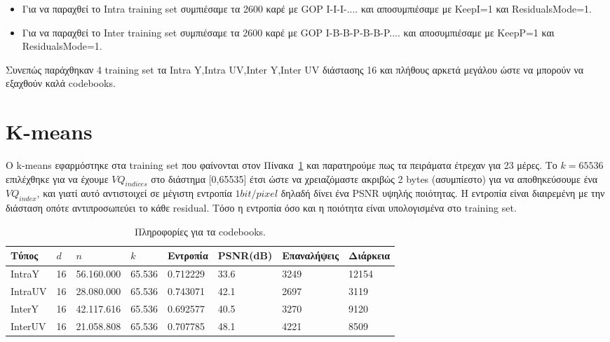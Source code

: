 \begin{itemize}
    \item Για να παραχθεί το Intra training set συμπιέσαμε τα 2600 καρέ με GOP I-I-I-.... και αποσυμπιέσαμε με KeepI=1 και ResidualsMode=1.
    \item Για να παραχθεί το Inter training set συμπιέσαμε τα 2600 καρέ με GOP I-Β-Β-P-B-B-P.... και αποσυμπιέσαμε με KeepP=1 και ResidualsMode=1.
\end{itemize}

\indent Συνεπώς παράχθηκαν 4 training set τα Intra Y,Intra UV,Inter Y,Inter UV διάστασης 16 και πλήθους αρκετά μεγάλου ώστε να μπορούν να εξαχθούν καλά codebooks.

\section{K-means}
\label{section:sect44}

\indent Ο k-means εφαρμόστηκε στα training set που φαίνονται στον Πίνακα~\ref{table:trainingset} και παρατηρούμε πως τα πειράματα έτρεχαν για 23 μέρες. Το $k=65536$ επιλέχθηκε για να έχουμε $VQ_{indices}$ στο διάστημα [0,65535] έτσι ώστε να χρειαζόμαστε ακριβώς 2 bytes (ασυμπίεστο) για να αποθηκεύσουμε ένα $VQ_{index}$, και γιατί αυτό αντιστοιχεί σε μέγιστη εντροπία $1 bit/pixel$ δηλαδή δίνει ένα PSNR υψηλής ποιότητας. Η εντροπία είναι διαιρεμένη με την διάσταση οπότε αντιπροσωπεύει το κάθε residual. Τόσο η εντροπία όσο και η ποιότητα είναι υπολογισμένα στο training set.

\begin{table}[h!]
    \begin{center}
        \begin{tabular}{|| l || l || l || l || l | l | l | l |}
        \hline
        Τύπος    & $d$  & $n$      & $k$   & Εντροπία   & PSNR(dB) & Επαναλήψεις   & Διάρκεια       \\ \hline
        IntraY   & 16   & 56.160.000 & 65.536 & 0.712229   & 33.6     &  3249         & 12154          \\ \hline
        IntraUV  & 16   & 28.080.000 & 65.536 & 0.743071   & 42.1     &  2697         & 3119           \\ \hline
        InterY   & 16   & 42.117.616 & 65.536 & 0.692577   & 40.5     &  3270         & 9120           \\ \hline
        InterUV  & 16   & 21.058.808 & 65.536 & 0.707785   & 48.1     &  4221         & 8509           \\ \hline
        \hline
        \end{tabular}
    \end{center}

    \caption{Πληροφορίες για τα codebooks.}
    \label{table:trainingset}
\end{table}

